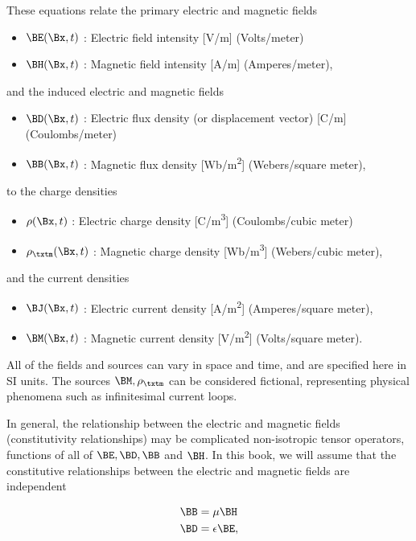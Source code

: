 These equations relate the primary electric and magnetic fields
\begin{itemize}
	\item \( \BE(\Bx, t) \) : Electric field intensity [\si{V/m}] (Volts/meter)
	\item \( \BH(\Bx, t) \) : Magnetic field intensity [\si{A/m}] (Amperes/meter),
\end{itemize}
and the induced electric and magnetic fields
\begin{itemize}
	\item \( \BD(\Bx, t) \) : Electric flux density (or displacement vector) [\si{C/m}] (Coulombs/meter)
	\item \( \BB(\Bx, t) \) : Magnetic flux density [\si{Wb/m^2}] (Webers/square meter),
\end{itemize}
to the charge densities
\begin{itemize}
	\item \( \rho(\Bx, t) \) : Electric charge density [\si{C/m^3}] (Coulombs/cubic meter)
   \item \( \rho_\txtm(\Bx, t) \) : Magnetic charge density [\si{Wb/m^3}] (Webers/cubic meter),
\end{itemize}
and the current densities
\begin{itemize}
	\item \( \BJ(\Bx, t) \) : Electric current density [\si{A/m^2}] (Amperes/square meter),
   \item \( \BM(\Bx, t) \) : Magnetic current density [\si{V/m^2}] (Volts/square meter).
\end{itemize}

All of the fields and sources can vary in space and time, and are specified here in SI units.
The sources \( \BM, \rho_\txtm \) can be considered fictional, representing physical phenomena such as infinitesimal current loops.

In general, the relationship between the electric and magnetic fields (constitutivity relationships) may be complicated
non-isotropic tensor operators, functions of all of \( \BE, \BD, \BB \) and \( \BH \).
In this book, we will assume that the constitutive relationships between the electric and magnetic fields are independent

\index{\(\mu\)}
\index{\(\epsilon\)}
\begin{equation}\label{eqn:freespace:300}
\begin{aligned}
\BB &= \mu \BH \\
\BD &= \epsilon \BE,
\end{aligned}
\end{equation}

